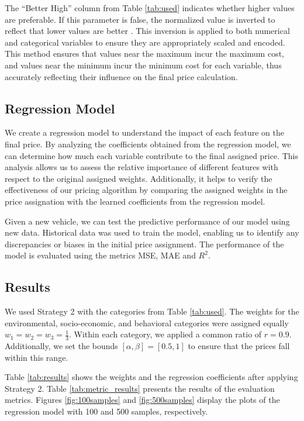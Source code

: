 \documentclass[12pt]{book}
\begin{document}
The ``Better High'' column from Table \ref{tab:used} indicates whether higher values are preferable. If this parameter is false, the normalized value is inverted to reflect that lower values are better \cite{witten2005practical}. This inversion is applied to both numerical and categorical variables to ensure they are appropriately scaled and encoded. This method ensures that values near the maximum incur the maximum cost, and values near the minimum incur the minimum cost for each variable, thus accurately reflecting their influence on the final price calculation.



\subsection{Regression Model}

We create a regression model to understand the impact of each feature on the final price. By analyzing the coefficients obtained from the regression model, we can determine how much each variable contribute to the final assigned price. This analysis allows us to assess the relative importance of different features with respect to the original assigned weights. Additionally, it helps to verify the effectiveness of our pricing algorithm by comparing the assigned weights in the price assignation with the learned coefficients from the regression model.

Given a new vehicle, we can test the predictive performance of our model using new data. Historical data was used to train the model, enabling us to identify any discrepancies or biases in the initial price assignment. The performance of the model is evaluated using the metrics MSE, MAE and $R^2$.


\subsection{Results}

We used Strategy 2 with the categories from Table \ref{tab:used}. The weights for the environmental, socio-economic, and behavioral categories were assigned equally $w_1 = w_2 = w_3 = \frac{1}{3}$. Within each category, we applied a common ratio of $r=0.9$. Additionally, we set the bounds $[\alpha, \beta] = [0.5, 1]$ to ensure that the prices fall within this range.

Table \ref{tab:results} shows the weights and the regression coefficients after applying Strategy 2. Table \ref{tab:metric_results} presents the results of the evaluation metrics. Figures \ref{fig:100samples} and \ref{fig:500samples} display the plots of the regression model with 100 and 500 samples, respectively.
\end{document}
